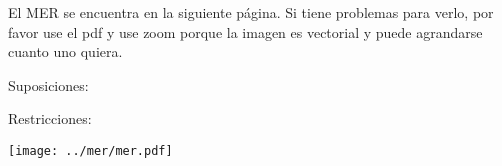
El MER se encuentra en la siguiente página. Si tiene problemas para verlo, por favor use el pdf y use zoom porque la imagen es vectorial y puede agrandarse cuanto uno quiera.

Suposiciones:

Restricciones:


\newpage

\texttt{[image: ../mer/mer.pdf]}

